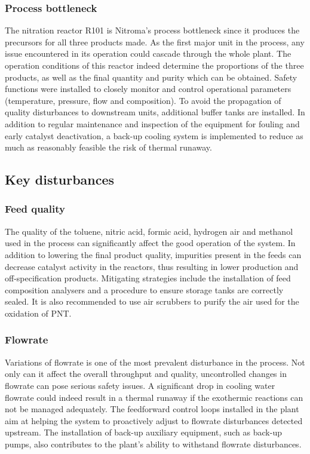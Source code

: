 \subsubsection{Process bottleneck} %

The nitration reactor R101 is Nitroma's process bottleneck since it produces the precursors for all three products made. As the first major unit in the process, any issue encountered in its operation could cascade through the whole plant. The operation conditions of this reactor indeed determine the proportions of the three products, as well as the final quantity and purity which can be obtained. 	Safety functions were installed to closely monitor and control operational parameters (temperature, pressure, flow and composition). To avoid the propagation of quality disturbances to downstream units, additional buffer tanks are installed. In addition to regular maintenance and inspection of the equipment for fouling and early catalyst deactivation, a back-up cooling system is implemented to reduce as much as reasonably feasible the risk of thermal runaway.


\subsection{Key disturbances} %

\subsubsection{Feed quality}
The quality of the toluene, nitric acid, formic acid, hydrogen air and methanol used in the process can significantly affect the good operation of the system. In addition to lowering the final product quality, impurities present in the feeds can decrease catalyst activity in the reactors, thus resulting in lower production and off-specification products. Mitigating strategies include the installation of feed composition analysers and a procedure to ensure storage tanks are correctly sealed. It is also recommended to use air scrubbers to purify the air used for the oxidation of PNT.

\subsubsection{Flowrate}
Variations of flowrate is one of the most prevalent disturbance in the process. Not only can it affect the overall throughput and quality, uncontrolled changes in flowrate can pose serious safety issues. A significant drop in cooling water flowrate could indeed result in a thermal runaway if the exothermic reactions can not be managed adequately. The feedforward control loops installed in the plant aim at helping the system to proactively adjust to flowrate disturbances detected upstream. The installation of back-up auxiliary equipment, such as back-up pumps, also contributes to the plant's ability to withstand flowrate disturbances.


